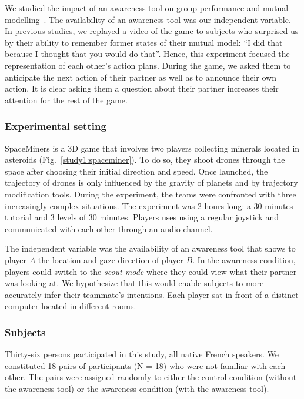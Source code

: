 \documentclass[twocolumn]{article}
\begin{document}
We studied the impact of an awareness tool on group performance and mutual
modelling~\citep{nova2007collaboration}. The availability
of an awareness tool was our independent variable. In previous studies, we
replayed a video of the game to subjects who surprised us by their ability to
remember former states of their mutual model: ``I did that because I thought that
you would do that''. Hence, this experiment focused the representation of each
other's action plans. During the game, we asked them to anticipate the next
action of their partner as well as to announce their own action. It is clear
asking them a question about their partner increases their attention for the
rest of the game.

\subsubsection*{Experimental setting}

SpaceMiners is a 3D game that involves two players collecting minerals located
in asteroids (Fig.~\ref{study1:spaceminer}). To do so, they shoot drones through
the space after choosing their initial direction and speed. Once launched, the
trajectory of drones is only influenced by the gravity of planets and by
trajectory modification tools.  During the experiment, the teams were confronted
with three increasingly complex situations. The experiment was 2 hours long: a
30 minutes tutorial and 3 levels of 30 minutes. Players uses using a regular
joystick and communicated with each other through an audio channel.

The independent variable was the availability of an awareness tool that shows to
player $A$  the location and gaze direction of player $B$. In the awareness
condition, players could switch to the \emph{scout mode} where they could view what
their partner was looking at. We hypothesize that this would enable subjects to
more accurately infer their teammate's intentions. Each player sat in front of a
distinct computer located in different rooms. 

\subsubsection*{Subjects}

Thirty-six persons participated in this study, all native French speakers. We
constituted 18 pairs of participants (N = 18) who were not familiar with each
other. The pairs were assigned randomly to either the control condition (without
the awareness tool) or the awareness condition (with the awareness tool).
\end{document}
